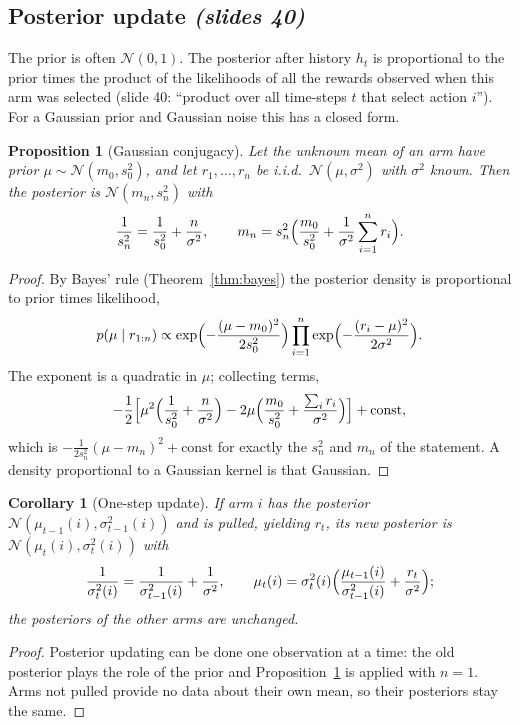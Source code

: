 \documentclass[11pt,a4paper]{article}
\newcommand{\Norm}{\mathcal{N}}
\newcommand{\slides}[1]{\emph{(slides #1)}}
\theoremstyle{plain}
\newtheorem{proposition}[theorem]{Proposition}
\newtheorem{corollary}[theorem]{Corollary}
\theoremstyle{definition}
\theoremstyle{remark}
\begin{document}
\subsection{Posterior update \slides{40}}

The prior is often $\Norm(0,1)$. The posterior after history $h_t$ is proportional to the prior times the product of the likelihoods of all the rewards observed when this arm was selected (slide 40: ``product over all time-steps $t$ that select action $i$''). For a Gaussian prior and Gaussian noise this has a closed form.

\begin{proposition}[Gaussian conjugacy]\label{prop:gauss}
Let the unknown mean of an arm have prior $\mu\sim\Norm(m_0,s_0^2)$, and let $r_1,\dots,r_n$ be i.i.d.\ $\Norm(\mu,\sigma^2)$ with $\sigma^2$ known. Then the posterior is $\Norm(m_n,s_n^2)$ with
\[
 \frac1{s_n^2}=\frac1{s_0^2}+\frac n{\sigma^2},\qquad m_n=s_n^2\Bigl(\frac{m_0}{s_0^2}+\frac1{\sigma^2}\sum_{i=1}^nr_i\Bigr).
\]
\end{proposition}
\begin{proof}
By Bayes' rule (Theorem~\ref{thm:bayes}) the posterior density is proportional to prior times likelihood,
\[
 p(\mu\mid r_{1:n})\propto\exp\Bigl(-\frac{(\mu-m_0)^2}{2s_0^2}\Bigr)\prod_{i=1}^n\exp\Bigl(-\frac{(r_i-\mu)^2}{2\sigma^2}\Bigr).
\]
The exponent is a quadratic in $\mu$; collecting terms,
\[
 -\frac12\Bigl[\mu^2\Bigl(\frac1{s_0^2}+\frac n{\sigma^2}\Bigr)-2\mu\Bigl(\frac{m_0}{s_0^2}+\frac{\sum_ir_i}{\sigma^2}\Bigr)\Bigr]+\text{const},
\]
which is $-\frac1{2s_n^2}(\mu-m_n)^2+\text{const}$ for exactly the $s_n^2$ and $m_n$ of the statement. A density proportional to a Gaussian kernel is that Gaussian.
\end{proof}

\begin{corollary}[One-step update]\label{cor:gauss-step}
If arm $i$ has the posterior $\Norm(\mu_{t-1}(i),\sigma_{t-1}^2(i))$ and is pulled, yielding $r_t$, its new posterior is $\Norm(\mu_t(i),\sigma_t^2(i))$ with
\[
 \frac1{\sigma_t^2(i)}=\frac1{\sigma_{t-1}^2(i)}+\frac1{\sigma^2},\qquad
 \mu_t(i)=\sigma_t^2(i)\Bigl(\frac{\mu_{t-1}(i)}{\sigma_{t-1}^2(i)}+\frac{r_t}{\sigma^2}\Bigr);
\]
the posteriors of the other arms are unchanged.
\end{corollary}
\begin{proof}
Posterior updating can be done one observation at a time: the old posterior plays the role of the prior and Proposition~\ref{prop:gauss} is applied with $n=1$. Arms not pulled provide no data about their own mean, so their posteriors stay the same.
\end{proof}
\end{document}
